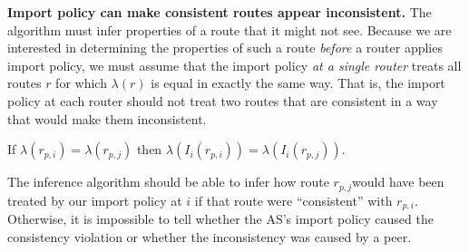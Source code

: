 


{\bf Import policy can make consistent routes appear
   inconsistent.}  The algorithm must infer
   properties of a route that it might not see.  Because we are
   interested in determining the properties of such a route {\em before}
   a router applies import policy, we must assume that the import policy
   {\em at a single router} treats all routes $r$ for which $\lambda(r)$ is
   equal in exactly the same way.  That is, the import policy at each
   router should not treat two routes that are consistent in a way that
   would make them inconsistent. 

\begin{constraint}\label{c:consistent} 
If $\lambda(r_{p,i})=\lambda(r_{p,j})$ then 
  $\lambda(I_{i}(r_{p,i}))=\lambda(I_{i}(r_{p,j}))$.
\end{constraint}

The inference algorithm should be able to infer how route $r_{p,j}$would
have been treated by our import policy at $i$ if that route were
``consistent'' with $r_{p,i}$.  Otherwise, it is impossible to tell
whether the AS's import policy caused the consistency violation or
whether the inconsistency was caused by a peer.

